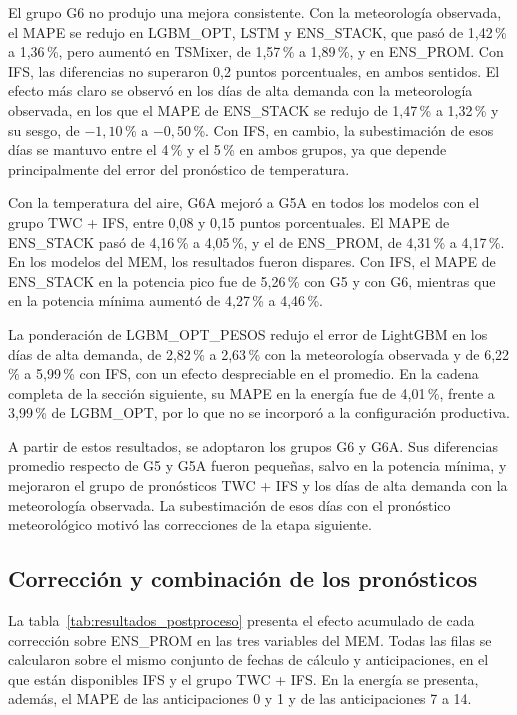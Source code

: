 El grupo G6 no produjo una mejora consistente. Con la meteorología observada, el MAPE se redujo en LGBM\_OPT, LSTM y ENS\_STACK, que pasó de 1,42\,\% a 1,36\,\%, pero aumentó en TSMixer, de 1,57\,\% a 1,89\,\%, y en ENS\_PROM. Con IFS, las diferencias no superaron 0,2 puntos porcentuales, en ambos sentidos. El efecto más claro se observó en los días de alta demanda con la meteorología observada, en los que el MAPE de ENS\_STACK se redujo de 1,47\,\% a 1,32\,\% y su sesgo, de $-1{,}10$\,\% a $-0{,}50$\,\%. Con IFS, en cambio, la subestimación de esos días se mantuvo entre el 4\,\% y el 5\,\% en ambos grupos, ya que depende principalmente del error del pronóstico de temperatura.

Con la temperatura del aire, G6A mejoró a G5A en todos los modelos con el grupo TWC + IFS, entre 0,08 y 0,15 puntos porcentuales. El MAPE de ENS\_STACK pasó de 4,16\,\% a 4,05\,\%, y el de ENS\_PROM, de 4,31\,\% a 4,17\,\%. En los modelos del MEM, los resultados fueron dispares. Con IFS, el MAPE de ENS\_STACK en la potencia pico fue de 5,26\,\% con G5 y con G6, mientras que en la potencia mínima aumentó de 4,27\,\% a 4,46\,\%.

La ponderación de LGBM\_OPT\_PESOS redujo el error de LightGBM en los días de alta demanda, de 2,82\,\% a 2,63\,\% con la meteorología observada y de 6,22\,\% a 5,99\,\% con IFS, con un efecto despreciable en el promedio. En la cadena completa de la sección siguiente, su MAPE en la energía fue de 4,01\,\%, frente a 3,99\,\% de LGBM\_OPT, por lo que no se incorporó a la configuración productiva.

A partir de estos resultados, se adoptaron los grupos G6 y G6A. Sus diferencias promedio respecto de G5 y G5A fueron pequeñas, salvo en la potencia mínima, y mejoraron el grupo de pronósticos TWC + IFS y los días de alta demanda con la meteorología observada. La subestimación de esos días con el pronóstico meteorológico motivó las correcciones de la etapa siguiente.

\subsection{Corrección y combinación de los pronósticos}
\label{subsec:resultados_postproceso}

La tabla~\ref{tab:resultados_postproceso} presenta el efecto acumulado de cada corrección sobre ENS\_PROM en las tres variables del MEM. Todas las filas se calcularon sobre el mismo conjunto de fechas de cálculo y anticipaciones, en el que están disponibles IFS y el grupo TWC + IFS. En la energía se presenta, además, el MAPE de las anticipaciones 0 y 1 y de las anticipaciones 7 a 14.

